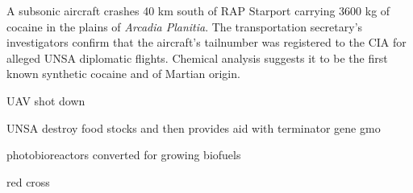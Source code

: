 A subsonic aircraft crashes 40 km south of RAP Starport carrying 3600 kg of cocaine in the plains of {\it Arcadia Planitia}. The transportation secretary's investigators confirm that the aircraft's tailnumber was registered to the CIA for alleged UNSA diplomatic flights. Chemical analysis suggests it to be the first known synthetic cocaine and of Martian origin.
\StopTimelineDate

UAV shot down

UNSA destroy food stocks and then provides aid with terminator gene gmo

photobioreactors converted for growing biofuels

red cross

